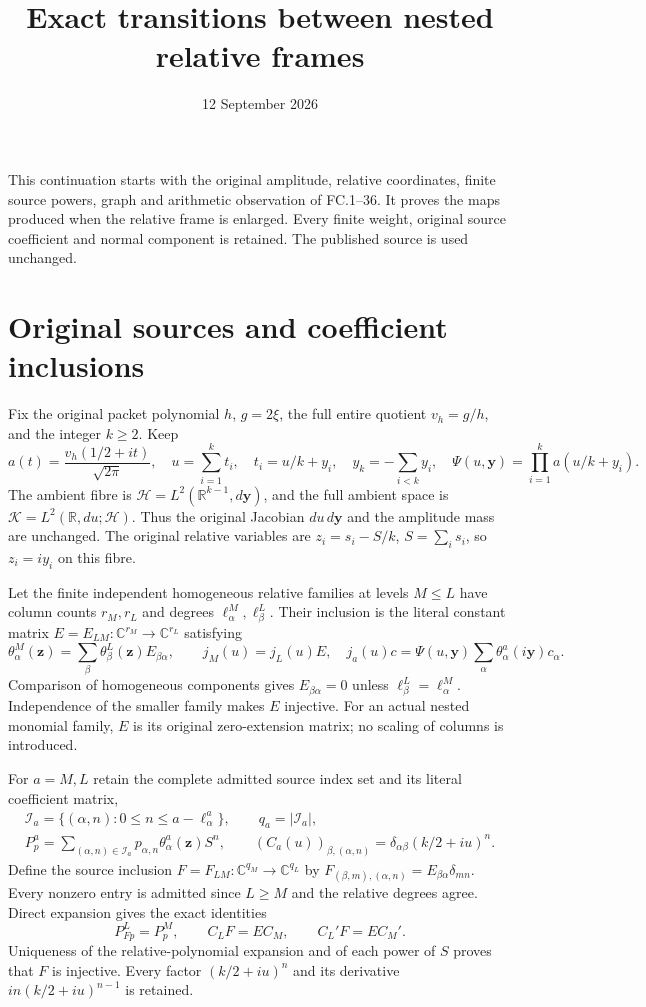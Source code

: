 \documentclass[11pt]{article}
\title{Exact transitions between nested relative frames}
\author{}
\date{12 September 2026}
\begin{document}
\maketitle

This continuation starts with the original amplitude, relative coordinates,
finite source powers, graph and arithmetic observation of FC.1--36.
It proves the maps produced when the relative frame is enlarged.
Every finite weight, original source coefficient and normal component
is retained. The published source is used unchanged.

\section{Original sources and coefficient inclusions}

Fix the original packet polynomial $h$, $g=2\xi$, the full entire
quotient $v_h=g/h$, and the integer $k\ge2$. Keep
\[
 a(t)=\frac{v_h(1/2+it)}{\sqrt{2\pi}},\quad
 u=\sum_{i=1}^k t_i,\quad t_i=u/k+y_i,\quad
 y_k=-\sum_{i<k}y_i,\quad
 \Psi(u,\mathbf y)=\prod_{i=1}^k a(u/k+y_i).
 \tag{NT.1}
\]
The ambient fibre is $\mathscr H=L^2(\mathbb R^{k-1},d\mathbf y)$,
and the full ambient space is
$\mathscr K=L^2(\mathbb R,du;\mathscr H)$.
Thus the original Jacobian $du\,d\mathbf y$ and the amplitude mass
are unchanged. The original relative variables are
$z_i=s_i-S/k$, $S=\sum_i s_i$, so $z_i=iy_i$ on this fibre.

Let the finite independent homogeneous relative families at levels
$M\le L$ have column counts $r_M,r_L$ and degrees
$\ell^{M}_{\alpha},\ell^{L}_{\beta}$. Their inclusion is the literal
constant matrix $E=E_{LM}:\mathbb C^{r_M}\to\mathbb C^{r_L}$ satisfying
\[
 \theta^M_\alpha(\mathbf z)
  =\sum_\beta\theta^L_\beta(\mathbf z)E_{\beta\alpha},\qquad
 j_M(u)=j_L(u)E,
 \quad j_a(u)c=\Psi(u,\mathbf y)
                    \sum_\alpha\theta^a_\alpha(i\mathbf y)c_\alpha.
 \tag{NT.2}
\]
Comparison of homogeneous components gives
$E_{\beta\alpha}=0$ unless
$\ell^L_\beta=\ell^M_\alpha$. Independence of the smaller
family makes $E$ injective. For an actual nested monomial family,
$E$ is its original zero-extension matrix; no scaling of columns
is introduced.

For $a=M,L$ retain the complete admitted source index set and its
literal coefficient matrix,
\[
 \begin{gathered}
 \mathcal I_a=\{(\alpha,n):0\le n\le a-\ell^a_\alpha\},\qquad
 q_a=|\mathcal I_a|,\\
 P^a_p=\sum_{(\alpha,n)\in\mathcal I_a}
                  p_{\alpha,n}\theta^a_\alpha(\mathbf z)S^n,\qquad
 (C_a(u))_{\beta,(\alpha,n)}
       =\delta_{\alpha\beta}(k/2+iu)^n.
 \end{gathered}
 \tag{NT.3}
\]
Define the source inclusion $F=F_{LM}:\mathbb C^{q_M}\to
\mathbb C^{q_L}$ by
$F_{(\beta,m),(\alpha,n)}=E_{\beta\alpha}\delta_{mn}$.
Every nonzero entry is admitted since $L\ge M$ and the relative
degrees agree. Direct expansion gives the exact identities
\[
 P^L_{Fp}=P^M_p,\qquad C_LF=EC_M,\qquad C_L'F=EC_M'.
 \tag{NT.4}
\]
Uniqueness of the relative-polynomial expansion and of each power of
$S$ proves that $F$ is injective. Every factor $(k/2+iu)^n$ and
its derivative $in(k/2+iu)^{n-1}$ is retained.
\end{document}
